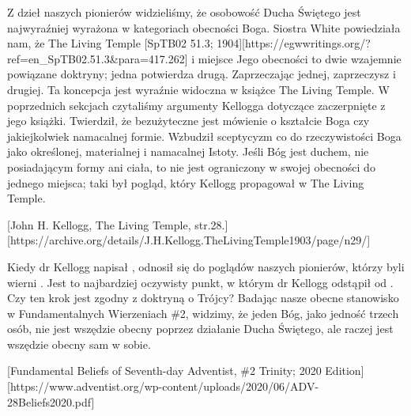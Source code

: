 Z dzieł naszych pionierów widzieliśmy, że osobowość Ducha Świętego jest najwyraźniej wyrażona w kategoriach obecności Boga. Siostra White powiedziała nam, że The Living Temple [SpTB02 51.3; 1904][https://egwwritings.org/?ref=en\_SpTB02.51.3&para=417.262]  i miejsce Jego obecności to dwie wzajemnie powiązane doktryny; jedna potwierdza drugą. Zaprzeczając jednej, zaprzeczysz i drugiej. Ta koncepcja jest wyraźnie widoczna w książce The Living Temple. W poprzednich sekcjach czytaliśmy argumenty Kellogga dotyczące  zaczerpnięte z jego książki. Twierdził, że bezużyteczne jest mówienie o kształcie Boga czy jakiejkolwiek namacalnej formie. Wzbudził sceptycyzm co do rzeczywistości Boga jako określonej, materialnej i namacalnej Istoty. Jeśli Bóg jest duchem, nie posiadającym formy ani ciała, to nie jest ograniczony w swojej obecności do jednego miejsca; taki był pogląd, który Kellogg propagował w The Living Temple.

[John H. Kellogg, The Living Temple, str.28.][https://archive.org/details/J.H.Kellogg.TheLivingTemple1903/page/n29/]

Kiedy dr Kellogg napisał , odnosił się do poglądów naszych pionierów, którzy byli wierni . Jest to najbardziej oczywisty punkt, w którym dr Kellogg odstąpił od . Czy ten krok jest zgodny z doktryną o Trójcy? Badając nasze obecne stanowisko w Fundamentalnych Wierzeniach \#2, widzimy, że jeden Bóg, jako jedność trzech osób, nie jest wszędzie obecny poprzez działanie Ducha Świętego, ale raczej jest wszędzie obecny sam w sobie.

[Fundamental Beliefs of Seventh-day Adventist, \#2 Trinity; 2020 Edition][https://www.adventist.org/wp-content/uploads/2020/06/ADV-28Beliefs2020.pdf]

